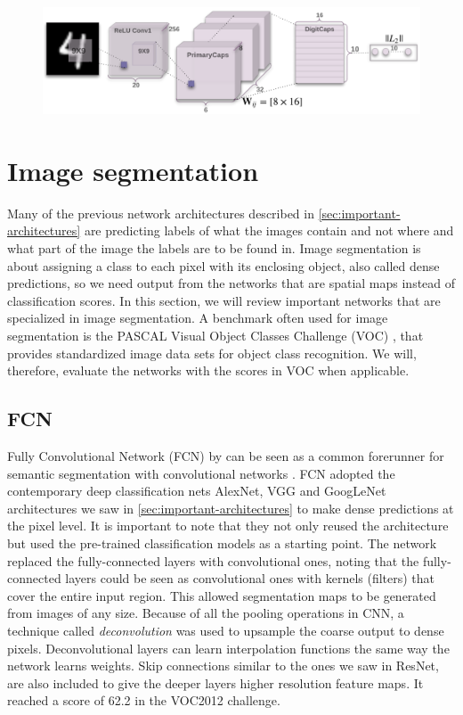 \begin{figure}[H]
    \centering
    \includegraphics[width=0.7\linewidth]{fig/capsnet.png}
    \label{fig:capsnet}
\end{figure}


\section{Image segmentation}
Many of the previous network architectures described in \autoref{sec:important-architectures} are predicting labels of what the images contain and not where and what part of the image the labels are to be found in. Image segmentation is about assigning a class to each pixel with its enclosing object, also called dense predictions, so we need output from the networks that are spatial maps instead of classification scores. In this section, we will review important networks that are specialized in image segmentation. A benchmark often used for image segmentation is the PASCAL Visual Object Classes Challenge (VOC) \cite{Everingham2010}, that provides standardized image data sets for object class recognition. We will, therefore, evaluate the networks with the scores in VOC when applicable.


\subsection{FCN}
Fully Convolutional Network (FCN) by \citet{Long2014} can be seen as a common forerunner for semantic segmentation with convolutional networks \cite{Garcia-Garcia2017}. FCN adopted the contemporary deep classification nets AlexNet, VGG and GoogLeNet architectures we saw in \autoref{sec:important-architectures} to make dense predictions at the pixel level. It is important to note that they not only reused the architecture but used the pre-trained classification models as a starting point. The network replaced the fully-connected layers with convolutional ones, noting that the fully-connected layers could be seen as convolutional ones with kernels (filters) that cover the entire input region. This allowed segmentation maps to be generated from images of any size. Because of all the pooling operations in CNN, a technique called \emph{deconvolution} \cite{Zeiler2011} was used to upsample the coarse output to dense pixels. Deconvolutional layers can learn interpolation functions the same way the network learns weights. Skip connections similar to the ones we saw in ResNet, are also included to give the deeper layers higher resolution feature maps. It reached a score of 62.2 in the VOC2012 challenge. 


